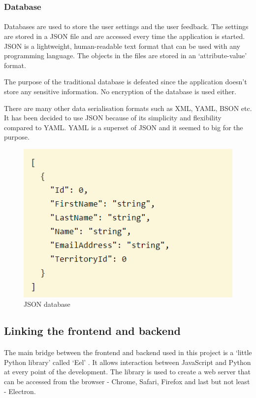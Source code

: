 \documentclass[12pt]{report}
\begin{document}
\subsubsection*{Database}
\paragraph{}
Databases are used to store the user settings and the user feedback. The settings are stored in a JSON file and are
accessed every time the application is started. JSON is a lightweight, human-readable text format that can be used with
any programming language. The objects in the files are stored in an `attribute-value' format. 

The purpose of the traditional database is defeated since the application doesn't store any sensitive information.
No encryption of the database is used either.

\clearpage

There are many other data serialisation formats such as XML, YAML, BSON etc. It has been decided to use JSON because
of its simplicity and flexibility compared to YAML. YAML is a superset of JSON and it seemed to big for the purpose.

\begin{figure}[ht]
  \centering
  \includegraphics[width=0.5\linewidth]{img/json_example.png}
  \caption{JSON database}
  \label{fig:json}
\end{figure}

\subsection*{Linking the frontend and backend}
\paragraph{}
The main bridge between the frontend and backend used in this project is a `little Python library' 
called `Eel' \citep{knott_2022_eel}. It allows interaction between JavaScript and Python at every point of
the development. The library is used to create a web server that can be accessed from the browser - 
Chrome, Safari, Firefox and last but not least - Electron. 
\end{document}
